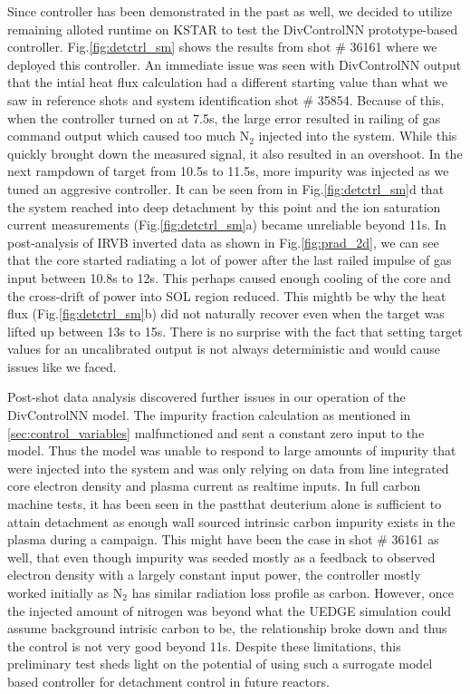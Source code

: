 Since \Afrac controller has been demonstrated in the past as well, we decided to utilize remaining alloted runtime on KSTAR to test the DivControlNN prototype-based controller.
Fig.\ref{fig:detctrl_sm} shows the results from shot \# 36161 where we deployed this controller.
An immediate issue was seen with DivControlNN output that the intial heat flux calculation had a different starting value than what we saw in reference shots and system identification shot \# 35854.
Because of this, when the controller turned on at 7.5s, the large error resulted in railing of gas command output which caused too much N$_2$ injected into the system.
While this quickly brought down the measured signal, it also resulted in an overshoot.
In the next rampdown of target from 10.5s to 11.5s, more impurity was injected as we tuned an aggresive controller.
It can be seen from \Afrac in Fig.\ref{fig:detctrl_sm}d that the system reached into deep detachment by this point and the ion saturation current measurements (Fig.\ref{fig:detctrl_sm}a) became unreliable beyond 11s.
In post-analysis of IRVB inverted data as shown in Fig.\ref{fig:prad_2d}, we can see that the core started radiating a lot of power after the last railed impulse of gas input between 10.8s to 12s.
This perhaps caused enough cooling of the core and the cross-drift of power into \ac{SOL} region reduced.
This mightb be why the heat flux (Fig.\ref{fig:detctrl_sm}b) did not naturally recover even when the target was lifted up between 13s to 15s.
There is no surprise with the fact that setting target values for an uncalibrated output is not always deterministic and would cause issues like we faced.

Post-shot data analysis discovered further issues in our operation of the DivControlNN model.
The impurity fraction calculation as mentioned in \ref{sec:control_variables} malfunctioned and sent a constant zero input to the model.
Thus the model was unable to respond to large amounts of impurity that were injected into the system and was only relying on data from line integrated core electron density and plasma current as realtime inputs.
In full carbon machine tests, it has been seen in the past\needcite that deuterium alone is sufficient to attain detachment as enough wall sourced intrinsic carbon impurity exists in the plasma during a campaign.
This might have been the case in shot \# 36161 as well, that even though impurity was seeded mostly as a feedback to observed electron density with a largely constant input power, the controller mostly worked initially as N$_2$ has similar radiation loss profile as carbon.
However, once the injected amount of nitrogen was beyond what the UEDGE simulation could assume background intrisic carbon to be, the relationship broke down and thus the control is not very good beyond 11s.
Despite these limitations, this preliminary test sheds light on the potential of using such a surrogate model based controller for detachment control in future reactors.